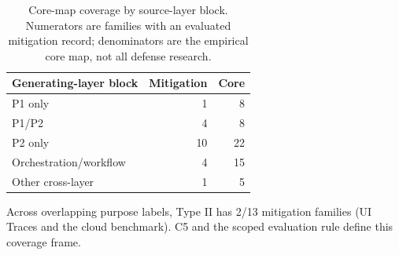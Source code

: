 \begin{table}[t]\centering\footnotesize
\caption{Core-map coverage by source-layer block. Numerators are families with an evaluated mitigation record; denominators are the empirical core map, not all defense research.}\label{tab:r34-coverage}
\begin{tabularx}{\columnwidth}{@{}Yrr@{}}\toprule
Generating-layer block & Mitigation & Core\\\midrule
P1 only & 1 & 8\\
P1/P2 & 4 & 8\\
P2 only & 10 & 22\\
Orchestration/workflow & 4 & 15\\
Other cross-layer & 1 & 5\\
\bottomrule\end{tabularx}
\par\smallskip\raggedright Across overlapping purpose labels, Type II has 2/13 mitigation families (UI Traces and the cloud benchmark). C5 and the scoped evaluation rule define this coverage frame.
\end{table}
